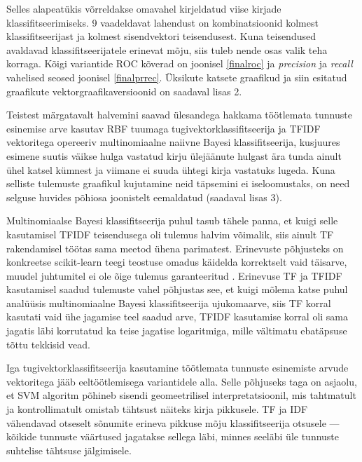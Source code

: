 \documentclass[]{trkuur}
\begin{document}
Selles alapeatükis võrreldakse omavahel kirjeldatud viise kirjade klassifitseerimiseks.
9 vaadeldavat lahendust on kombinatsioonid kolmest
klassifitseerijast ja kolmest sisendvektori teisendusest.
Kuna teisendused avaldavad klassifitseerijatele erinevat mõju, siis tuleb
nende osas valik teha korraga. Kõigi variantide ROC kõverad on joonisel \ref{finalroc}
ja \emph{precision} ja \emph{recall} vahelised seosed joonisel \ref{finalprrec}.
Üksikute katsete graafikud ja siin esitatud graafikute vektorgraafikaversioonid on saadaval lisas 2.

Teistest märgatavalt halvemini saavad ülesandega hakkama töötlemata tunnuste
esinemise arve kasutav RBF tuumaga tugivektorklassifitseerija ja TFIDF
vektoritega opereeriv multinomiaalne naiivne Bayesi klassifitseerija, kusjuures
esimene suutis väikse hulga vastatud kirju ülejäänute hulgast ära tunda ainult ühel katsel kümnest
ja viimane ei suuda ühtegi kirja vastatuks lugeda.
Kuna selliste tulemuste graafikul kujutamine neid täpsemini ei iseloomustaks,
on need selguse huvides põhiosa joonistelt eemaldatud (saadaval lisas 3).

Multinomiaalse Bayesi klassifitseerija puhul tasub tähele panna, et kuigi
selle kasutamisel TFIDF teisendusega oli tulemus halvim võimalik, siis
ainult TF rakendamisel töötas sama meetod ühena parimatest. Erinevuste põhjusteks
on konkreetse scikit-learn teegi teostuse omadus käidelda korrektselt vaid
täisarve, muudel juhtumitel ei ole õige tulemus garanteeritud \autocite{sklearnMNB}.
Erinevuse TF ja TFIDF kasutamisel saadud tulemuste vahel põhjustas see,
et kuigi mõlema katse puhul analüüsis multinomiaalne Bayesi klassifitseerija
ujukomaarve, siis TF korral kasutati vaid ühe jagamise teel saadud arve,
TFIDF kasutamise korral oli sama jagatis läbi korrutatud ka teise 
jagatise logaritmiga,
mille vältimatu ebatäpsuse tõttu tekkisid vead.

Iga tugivektorklassifitseerija kasutamine töötlemata tunnuste esinemiste arvude
vektoritega jääb eeltöötlemisega variantidele alla. Selle põhjuseks taga on
asjaolu, et SVM algoritm põhineb sisendi geomeetrilisel interpretatsioonil,
mis tahtmatult ja kontrollimatult omistab tähtsust näiteks kirja pikkusele.
TF ja IDF vähendavad otseselt sõnumite erineva pikkuse mõju klassifitseerija
otsusele --- kõikide tunnuste väärtused jagatakse sellega läbi, minnes seeläbi
üle tunnuste suhtelise tähtsuse jälgimisele.
\end{document}
